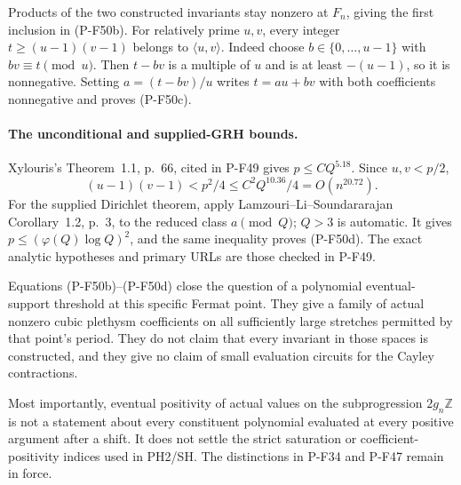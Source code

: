 Products of the two constructed invariants stay nonzero
at $F_n$, giving the first inclusion in (P-F50b).
For relatively prime $u,v$, every integer
$t\ge(u-1)(v-1)$ belongs to $\langle u,v\rangle$.
Indeed choose $b\in\{0,\ldots,u-1\}$ with
$bv\equiv t\pmod u$. Then $t-bv$ is a multiple of $u$
and is at least $-(u-1)$, so it is nonnegative.
Setting $a=(t-bv)/u$ writes $t=au+bv$ with both
coefficients nonnegative and proves (P-F50c).

\paragraph{The unconditional and supplied-GRH bounds.}
Xylouris's Theorem~1.1, p.~66, cited in P-F49 gives
$p\le C Q^{5.18}$. Since $u,v<p/2$,
\[
       (u-1)(v-1)<p^2/4
                      \le C^2Q^{10.36}/4=O(n^{20.72}).
                                                        \tag{P-F50r}
\]
For the supplied Dirichlet theorem, apply
Lamzouri--Li--Soundararajan Corollary~1.2, p.~3,
to the reduced class $a\pmod Q$; $Q>3$ is automatic.
It gives $p\le(\varphi(Q)\log Q)^2$, and the same
inequality proves (P-F50d). The exact analytic hypotheses
and primary URLs are those checked in P-F49.

Equations (P-F50b)--(P-F50d) close the question of a
polynomial eventual-support threshold at this specific
Fermat point. They give a family of actual nonzero
cubic plethysm coefficients on all sufficiently large
stretches permitted by that point's period. They do
not claim that every invariant in those spaces is
constructed, and they give no claim of small evaluation
circuits for the Cayley contractions.

Most importantly, eventual positivity of actual values
on the subprogression $2g_n\mathbb Z$ is not a statement
about every constituent polynomial evaluated at every
positive argument after a shift. It does not settle
the strict saturation or coefficient-positivity indices
used in PH2/SH. The distinctions in P-F34 and P-F47
remain in force.

